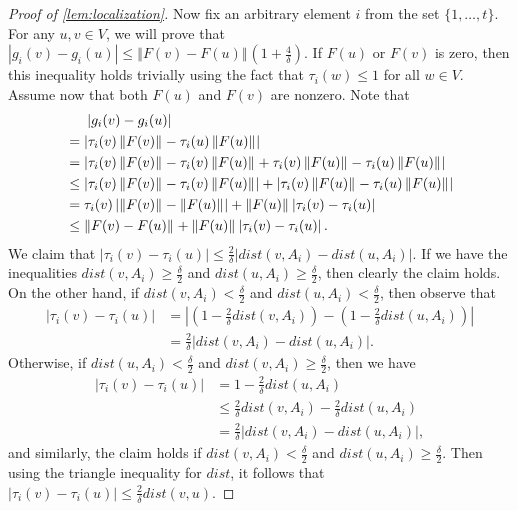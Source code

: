 \documentclass[12pt,a4paper,bold]{thesis}
\theoremstyle{definition}
\newcommand*{\abs}[1]{\left\vert #1 \right\vert}
\newcommand*{\norm}[2][]{\left\Vert #2 \right\Vert_{#1}}
\begin{document}
\begin{proof}[Proof of \cref{lem:localization}]
    Now fix an arbitrary element $i$ from the set $\{1, \dots, t\}$. 
    For any $u, v \in V$, we will prove that 
    $\abs{g_i(v) - g_i(u)} \leq \norm{F(v) - F(u)} \left(1 + \frac{4}{\delta}\right)$.
    If $F(u)$ or $F(v)$ is zero, then this inequality holds trivially using the fact
    that $\tau_i(w) \leq 1$ for all $w \in V$. 
	Assume now that both $F(u)$ and $F(v)$ are nonzero. Note that
    \begin{align*}
        & \hspace{0.49cm} \abs{g_i(v) - g_i(u)} 
		\\
        & =
        \abs{\tau_i(v) \norm{F(v)} - \tau_i(u) \norm{F(u)}}
        \\
        & =
        \abs{\tau_i(v) \norm{F(v)} - \tau_i(v) \norm{F(u)} + \tau_i(v) \norm{F(u)} 
        - \tau_i(u) \norm{F(u)}}
        \\
        & \leq 
        \abs{\tau_i(v) \norm{F(v)} - \tau_i(v) \norm{F(u)}} 
        + \abs{\tau_i(v) \norm{F(u)} - \tau_i(u) \norm{F(u)}}
        \\
        & =
        \tau_i(v) \abs{\norm{F(v)} - \norm{F(u)}} + \norm{F(u)} \abs{\tau_i(v) - \tau_i(u)}
        \\
        & \leq
        \norm{F(v) - F(u)} + \norm{F(u)} \abs{\tau_i(v) - \tau_i(u)}.
    \end{align*}
    We claim that 
    $\abs{\tau_i(v) - \tau_i(u)} \leq \frac{2}{\delta} \abs{dist(v, A_i) - dist(u, A_i)}$. 
    If we have the inequalities $dist(v, A_i) \geq \frac{\delta}{2}$ and 
    $dist(u, A_i) \geq \frac{\delta}{2}$, then clearly the claim holds. On the other hand,
    if $dist(v, A_i) < \frac{\delta}{2}$ and $dist(u, A_i) < \frac{\delta}{2}$, then 
    observe that
    \begin{align*}
        \abs{\tau_i(v) - \tau_i(u)} 
		& = 
		\abs{\left(1 - \frac{2}{\delta} dist(v, A_i)\right) 
        - \left(1 - \frac{2}{\delta} dist(u, A_i)\right)} 
		\\
        & = 
		\frac{2}{\delta} \abs{dist(v, A_i) - dist(u, A_i)}.
    \end{align*}
    Otherwise, if $dist(u, A_i) < \frac{\delta}{2}$ and $dist(v, A_i) \geq \frac{\delta}{2}$,
    then we have
    \begin{align*}
        \abs{\tau_i(v) - \tau_i(u)} 
		& = 
		1 - \frac{2}{\delta} dist(u, A_i)
		\\
        & \leq 
		\frac{2}{\delta} dist(v, A_i) - \frac{2}{\delta} dist(u, A_i)
		\\
        & = 
		\frac{2}{\delta} \abs{dist(v, A_i) - dist(u, A_i)},
    \end{align*}
    and similarly, the claim holds if $dist(v, A_i) < \frac{\delta}{2}$ and 
    $dist(u, A_i) \geq \frac{\delta}{2}$. Then using the triangle inequality 
    for $dist$, it follows that $\abs{\tau_i(v) - \tau_i(u)} \leq \frac{2}{\delta} dist(v,u)$.


\end{proof}
\end{document}
